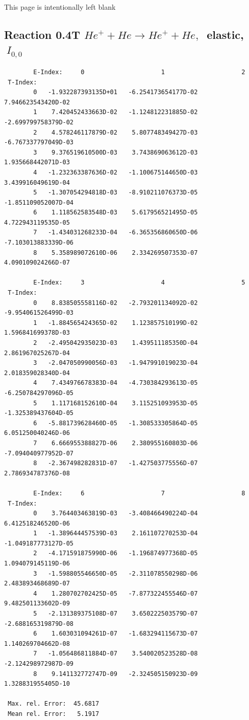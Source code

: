 \documentclass[12pt,dvips]{article}
\begin{document}
\newpage
This page is intentionally left blank
\newpage


\subsection{
Reaction 0.4T  $He^+ + He \rightarrow He^+ + He ,\ $
 elastic, $\  I_{0,0}$
}

\begin{small}\begin{verbatim}
        E-Index:     0                     1                     2
 T-Index:
        0   -1.932287393135D+01   -6.254173654177D-02    7.946623543420D-02
        1    7.420452433663D-02   -1.124812231885D-02   -2.699799758379D-02
        2    4.578246117879D-02    5.807748349427D-03   -6.767337797049D-03
        3    9.376519610500D-03    3.743869063612D-03    1.935668442071D-03
        4   -1.232363387636D-02   -1.100675144650D-03    3.439916049619D-04
        5   -1.307054294818D-03   -8.910211076373D-05   -1.851109052007D-04
        6    1.118562583548D-03    5.617956521495D-05    4.722943119535D-05
        7   -1.434031268233D-04   -6.365356860650D-06   -7.103013883339D-06
        8    5.358989072610D-06    2.334269507353D-07    4.090109024266D-07

        E-Index:     3                     4                     5
 T-Index:
        0    8.838505558116D-02   -2.793201134092D-02   -9.954061526499D-03
        1   -1.884565424365D-02    1.123857510199D-02    1.596841699378D-03
        2   -2.495042935023D-03    1.439511185350D-04    2.861967025267D-04
        3   -2.047050990056D-03   -1.947991019023D-04    2.018359028340D-04
        4    7.434976678383D-04   -4.730384293613D-05   -6.250784297096D-05
        5    1.117168152610D-04    3.115251093953D-05   -1.325389437604D-05
        6   -5.881739628460D-05   -1.308533305864D-05    6.051250040246D-06
        7    6.666955388827D-06    2.380955160803D-06   -7.094040977952D-07
        8   -2.367498282831D-07   -1.427503775556D-07    2.786934787376D-08

        E-Index:     6                     7                     8
 T-Index:
        0    3.764403463819D-03   -3.408466490224D-04    6.412518246520D-06
        1   -1.389644457539D-03    2.161107270253D-04   -1.049187773127D-05
        2   -4.171591875990D-06   -1.196874977368D-05    1.094079145119D-06
        3   -1.598805546650D-05   -2.311078550298D-06    2.483893468689D-07
        4    1.280702702425D-05   -7.877322455546D-07    9.482501133602D-09
        5   -2.131389375108D-07    3.650222503579D-07   -2.688165319879D-08
        6    1.603031094261D-07   -1.683294115673D-07    1.140269704662D-08
        7   -1.056486811884D-07    3.540020523528D-08   -2.124298972987D-09
        8    9.141132772747D-09   -2.324505150923D-09    1.328831955405D-10

 Max. rel. Error:  45.6817
 Mean rel. Error:   5.1917
\end{verbatim}\end{small}
\end{document}
